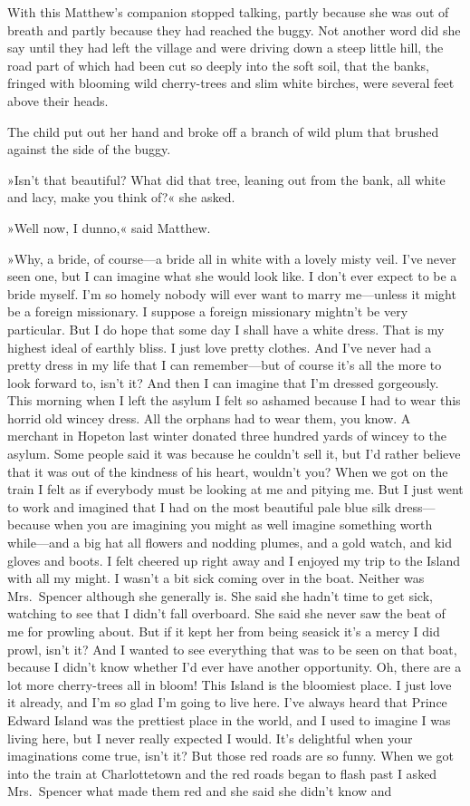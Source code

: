 With this Matthew's companion stopped talking, partly because she was out of breath and partly because they had reached the buggy. Not another word did she say until they had left the village and were driving down a steep little hill, the road part of which had been cut so deeply into the soft soil, that the banks, fringed with blooming wild cherry-trees and slim white birches, were several feet above their heads.

The child put out her hand and broke off a branch of wild plum that brushed against the side of the buggy.

»Isn't that beautiful? What did that tree, leaning out from the bank, all white and lacy, make you think of?« she asked.

»Well now, I dunno,« said Matthew.

»Why, a bride, of course—a bride all in white with a lovely misty veil. I've never seen one, but I can imagine what she would look like. I don't ever expect to be a bride myself. I'm so homely nobody will ever want to marry me—unless it might be a foreign missionary. I suppose a foreign missionary mightn't be very particular. But I do hope that some day I shall have a white dress. That is my highest ideal of earthly bliss. I just love pretty clothes. And I've never had a pretty dress in my life that I can remember—but of course it's all the more to look forward to, isn't it? And then I can imagine that I'm dressed gorgeously. This morning when I left the asylum I felt so ashamed because I had to wear this horrid old wincey dress. All the orphans had to wear them, you know. A merchant in Hopeton last winter donated three hundred yards of wincey to the asylum. Some people said it was because he couldn't sell it, but I'd rather believe that it was out of the kindness of his heart, wouldn't you? When we got on the train I felt as if everybody must be looking at me and pitying me. But I just went to work and imagined that I had on the most beautiful pale blue silk dress—because when you are imagining you might as well imagine something worth while—and a big hat all flowers and nodding plumes, and a gold watch, and kid gloves and boots. I felt cheered up right away and I enjoyed my trip to the Island with all my might. I wasn't a bit sick coming over in the boat. Neither was Mrs.~Spencer although she generally is. She said she hadn't time to get sick, watching to see that I didn't fall overboard. She said she never saw the beat of me for prowling about. But if it kept her from being seasick it's a mercy I did prowl, isn't it? And I wanted to see everything that was to be seen on that boat, because I didn't know whether I'd ever have another opportunity. Oh, there are a lot more cherry-trees all in bloom! This Island is the bloomiest place. I just love it already, and I'm so glad I'm going to live here. I've always heard that Prince Edward Island was the prettiest place in the world, and I used to imagine I was living here, but I never really expected I would. It's delightful when your imaginations come true, isn't it? But those red roads are so funny. When we got into the train at Charlottetown and the red roads began to flash past I asked Mrs.~Spencer what made them red and she said she didn't know and 